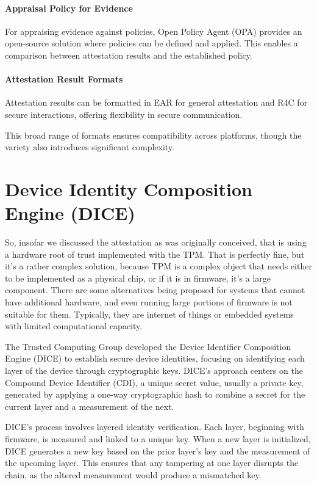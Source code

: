 \paragraph{Appraisal Policy for Evidence}  
For appraising evidence against policies, Open Policy Agent (OPA)
provides an open-source solution where policies can be defined and
applied. This enables a comparison between attestation results and the
established policy.

\paragraph{Attestation Result Formats}  
Attestation results can be formatted in EAR for general attestation
and R4C for secure interactions, offering flexibility in secure
communication.

This broad range of formats ensures compatibility across platforms,
though the variety also introduces significant complexity.

\section{Device Identity Composition Engine (DICE)}
So, insofar we discussed the attestation as was originally conceived,
that is using a hardware root of trust implemented with the TPM. That
is perfectly fine, but it's a rather complex solution, because TPM is
a complex object that needs either to be implemented as a physical
chip, or if it is in firmware, it's a large component. There are some
alternatives being proposed for systems that cannot have additional
hardware, and even running large portions of firmware is not suitable
for them. Typically, they are internet of things or embedded systems
with limited computational capacity.

The Trusted Computing Group developed the Device Identifier
Composition Engine (DICE) to establish secure device identities,
focusing on identifying each layer of the device through cryptographic
keys. DICE’s approach centers on the Compound Device Identifier (CDI),
a unique secret value, usually a private key, generated by applying a
one-way cryptographic hash to combine a secret for the current layer
and a measurement of the next.

DICE’s process involves layered identity verification. Each layer,
beginning with firmware, is measured and linked to a unique key. When
a new layer is initialized, DICE generates a new key based on the
prior layer’s key and the measurement of the upcoming layer. This
ensures that any tampering at one layer disrupts the chain, as the
altered measurement would produce a mismatched key.

